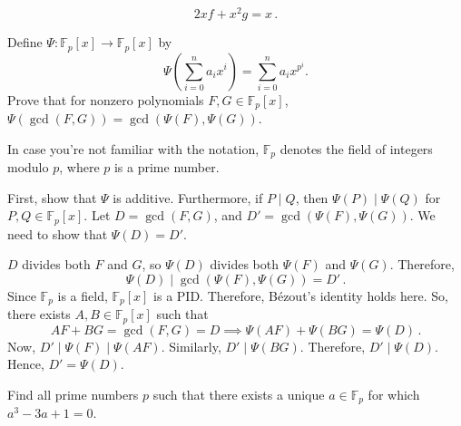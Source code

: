 \documentclass[11pt]{scrartcl}
\begin{document}
\[ 2xf + x^2 g = x \,. \]
\begin{exercise}\label{ex:usa_tst_16}
Define $\Psi : \mathbb F_p[x] \to \mathbb F_p[x]$ by\[ \Psi\left( \sum_{i=0}^n a_i x^i \right) = \sum_{i=0}^n a_i x^{p^i}. \]
Prove that for nonzero polynomials $F,G \in \mathbb F_p[x]$,
\(\Psi \left(\gcd(F,G)\right)  = \gcd \left(\Psi(F), \Psi(G)\right) \).
\end{exercise}
In case you're not familiar with the notation, \(\mathbb F_p\) denotes the field of integers modulo \(p\), where \(p\) is a prime number.

\begin{soln}
First, show that \(\Psi\) is additive. Furthermore, if \(P \mid Q\), then \(\Psi \left(P\right) \mid \Psi \left(Q\right) \) for \(P,Q \in \mathbb F_p \left[x\right] \). Let \(D = \gcd \left(F,G\right) \), and \(D' = \gcd \left( \Psi \left(F\right) , \Psi \left(G\right) \right)\).
We need to show that \(\Psi \left(D\right) = D' \).

\(D\) divides both \(F\) and \(G\), so \(\Psi \left(D\right) \) divides both \(\Psi \left(F\right) \) and \(\Psi \left(G\right) \). Therefore,
\[ \Psi \left(D\right) \mid \gcd \left( \Psi \left(F\right) , \Psi \left(G\right) \right) = D' \,. \]
Since \(\mathbb F_p\) is a field, \(\mathbb F_p [x]\) is a PID. Therefore, Bézout's identity holds here. So, there exists \(A,B \in \mathbb F_p \left[x\right] \) such that
\[ AF+BG = \gcd \left(F,G\right)  = D \implies \Psi \left(AF\right) + \Psi \left(BG\right)  = \Psi \left(D\right)  \,. \]
Now, \(D' \mid \Psi \left(F\right) \mid \Psi \left(AF\right) \). Similarly, \(D' \mid \Psi \left(BG\right) \). Therefore, \(D' \mid \Psi \left(D\right) \). Hence, \(D' = \Psi \left(D\right) \).
\end{soln}
\begin{exercise}[IMC 2020]
Find all prime numbers $p$ such that there exists a unique $a \in \mathbb{F}_p$ for which $a^3 - 3a + 1 = 0$.
\end{exercise}
\end{document}
